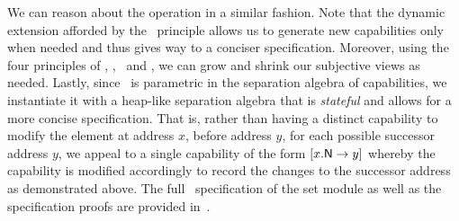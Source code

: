We can reason about the  operation in a similar fashion. Note that the dynamic extension afforded by the \extendRule\ principle allows us to generate new capabilities only when needed and thus gives way to a conciser specification. Moreover, using the four principles of \mergeRule, \forgetRule, \shiftRule\ and \copyRule, we can grow and shrink our subjective views as needed. Lastly, since \colosl\ is parametric in the separation algebra of capabilities, we instantiate it with a heap-like separation algebra that is \emph{stateful} and allows for a more concise specification. That is, rather than having a distinct capability to modify the element at address $x$, before address $y$, for each possible successor address $y$, we appeal to a single capability of the form $\nextC{x}{y}$ whereby the capability is modified accordingly to record the changes to the successor address as demonstrated above. The full \colosl\ specification of the set module as well as the specification proofs are provided in~\cite{colosl-tr14}.


